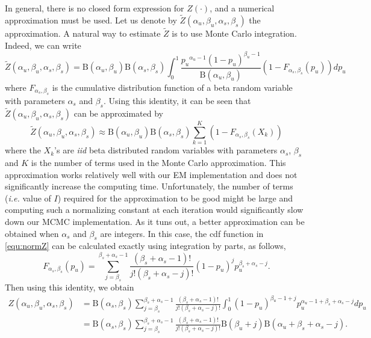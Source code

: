 \documentclass{article}
\begin{document}
In general, there is no closed form expression for $Z(\cdot)$, and a numerical approximation must be used. Let us denote by $\tilde{Z}(\alpha_u, \beta_u, \alpha_s, \beta_s)$ the approximation. A natural way to estimate $\tilde{Z}$ is to use Monte Carlo integration. Indeed, we can write 
\begin{equation}
\tilde{Z}(\alpha_u, \beta_u, \alpha_s, \beta_s)=\mathrm{B}(\alpha_u,\beta_u)\mathrm{B}(\alpha_s,\beta_s)\int_{0}^1\frac{{p_u}^{\alpha_u-1}(1-p_u)^{\beta_u-1}}{\mathrm{B}(\alpha_u,\beta_u)}(1-F_{\alpha_s,\beta_s}(p_u))dp_u
\label{equ:normZ}
\end{equation}
where $F_{\alpha_s,\beta_s}$ is the cumulative distribution function of a beta random variable with parameters $\alpha_s$ and $\beta_s$. Using this identity, it can be seen that $\tilde{Z}(\alpha_u, \beta_u, \alpha_s, \beta_s)$ can be approximated by 
\[
\tilde{Z}(\alpha_u, \beta_u, \alpha_s, \beta_s)\approx\mathrm{B}(\alpha_u,\beta_u)\mathrm{B}(\alpha_s,\beta_s)\sum_{k=1}^K(1-F_{\alpha_s,\beta_s}(X_k))
\]
where the $X_k$'s are \textit{iid} beta distributed random variables with parameters $\alpha_s$, $\beta_s$ and $K$ is the number of terms used in the Monte Carlo approximation. This approximation works relatively well with our EM implementation and does not significantly increase the computing time.
Unfortunately, the number of terms (\textit{i.e.} value of $I$) required for the approximation to be good might be large and computing such a normalizing constant at each iteration would significantly slow down our MCMC implementation. As it tuns out, a better approximation
can be obtained when $\alpha_s$ and $\beta_s$ are integers. In this case, the cdf function in \eqref{equ:normZ} can be calculated exactly using integration by parts, as follows,
\[
F_{\alpha_s,\beta_s}(p_u)=\sum_{j=\beta_s}^{\beta_s+\alpha_s-1} \frac{(\beta_s+\alpha_s-1)!}{j!(\beta_s+\alpha_s-j)!}(1-p_u)^jp_u^{\beta_s+\alpha_s-j}.
\label{eq:IBident}
\]
Then using this identity, we obtain
\begin{align*}
Z(\alpha_u, \beta_u, \alpha_s, \beta_s)&=\mathrm{B}(\alpha_s,\beta_s)\sum_{j=\beta_s}^{\beta_s+\alpha_s-1}\frac{(\beta_s+\alpha_s-1)!}{j!(\beta_s+\alpha_s-j)!}\int_{0}^1(1-p_u)^{\beta_u-1+j}p_u^{\alpha_u-1+\beta_s+\alpha_s-j}dp_u\\
&=\mathrm{B}(\alpha_s,\beta_s)\sum_{j=\beta_s}^{\beta_s+\alpha_s-1}\frac{(\beta_s+\alpha_s-1)!}{j!(\beta_s+\alpha_s-j)!}\mathrm{B}(\beta_u+j)\mathrm{B}(\alpha_u+\beta_s+\alpha_s-j).
\label{equ:normZ}
\end{align*}
\end{document}
